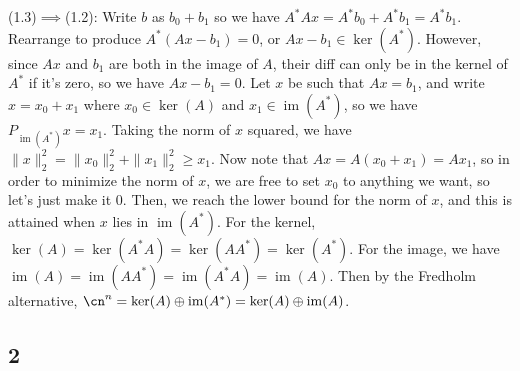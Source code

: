 \documentclass{article}
\DeclareMathOperator{\im}{im}
\begin{document}
(1.3)$\implies$(1.2): Write $b$ as $b_0+b_1$ so we have $A^*Ax=A^*b_0+A^*b_1=A^*b_1$. Rearrange to produce $A^*(Ax-b_1)=0$, or $Ax-b_1\in\ker(A^*)$. However, since $Ax$ and $b_1$ are both in the image of $A$, their diff can only be in the kernel of $A^*$ if it's zero, so we have $Ax-b_1=0$.
Let $x$ be such that $Ax=b_1$, and write $x=x_0+x_1$ where $x_0\in\ker(A)$ and $x_1\in\im(A^*)$, so we have $P_{\im(A^*)}x=x_1$. Taking the norm of $x$ squared, we have $\|x\|_2^2=\|x_0\|_2^2+\|x_1\|_2^2\geq x_1$. Now note that $Ax=A(x_0+x_1)=Ax_1$, so in order to minimize the norm of $x$, we are free to set $x_0$ to anything we want, so let's just make it $0$. Then, we reach the lower bound for the norm of $x$, and this is attained when $x$ lies in $\im(A^*)$. 
For the kernel, $\ker(A)=\ker(A^*A)=\ker(AA^*)=\ker(A^*)$. For the image, we have $\im(A)=\im(AA^*)=\im(A^*A)=\im(A)$. Then by the Fredholm alternative, $\cn^n=\ker(A)\oplus\im(A^*)=\ker(A)\oplus\im(A)$. 
\subsection*{2}
\end{document}
